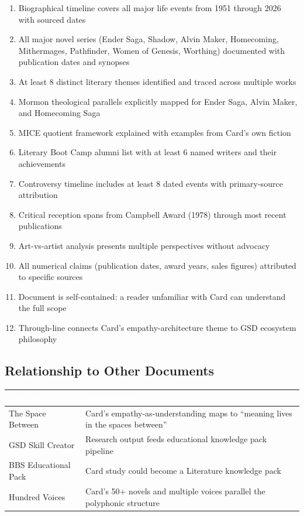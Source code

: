 \documentclass[11pt,letterpaper]{article}
\newcommand{\tableheader}[1]{\textbf{\sffamily\textcolor{white}{#1}}}
\begin{document}
\begin{enumerate}[leftmargin=2em]
  \item Biographical timeline covers all major life events from 1951 through 2026 with sourced dates
  \item All major novel series (Ender Saga, Shadow, Alvin Maker, Homecoming, Mithermages, Pathfinder, Women of Genesis, Worthing) documented with publication dates and synopses
  \item At least 8 distinct literary themes identified and traced across multiple works
  \item Mormon theological parallels explicitly mapped for Ender Saga, Alvin Maker, and Homecoming Saga
  \item MICE quotient framework explained with examples from Card's own fiction
  \item Literary Boot Camp alumni list with at least 6 named writers and their achievements
  \item Controversy timeline includes at least 8 dated events with primary-source attribution
  \item Critical reception spans from Campbell Award (1978) through most recent publications
  \item Art-vs-artist analysis presents multiple perspectives without advocacy
  \item All numerical claims (publication dates, award years, sales figures) attributed to specific sources
  \item Document is self-contained: a reader unfamiliar with Card can understand the full scope
  \item Through-line connects Card's empathy-architecture theme to GSD ecosystem philosophy
\end{enumerate}

\subsection{Relationship to Other Documents}

\begin{center}
\begin{tabularx}{\textwidth}{L{4cm}X}
\toprule
{}
\tableheader{Document} & \tableheader{Relationship} \\
\midrule
The Space Between & Card's empathy-as-understanding maps to ``meaning lives in the spaces between'' \\
GSD Skill Creator & Research output feeds educational knowledge pack pipeline \\
BBS Educational Pack & Card study could become a Literature knowledge pack \\
Hundred Voices & Card's 50+ novels and multiple voices parallel the polyphonic structure \\
\bottomrule
\end{tabularx}
\end{center}
\end{document}
